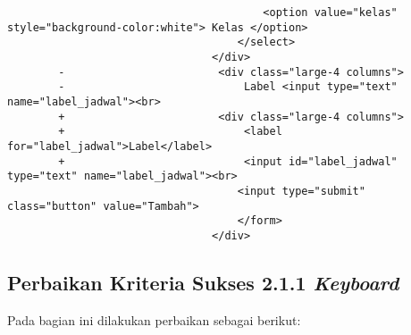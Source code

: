 \begin{itemize}
\begin{lstlisting}
                                        <option value="kelas" style="background-color:white"> Kelas </option>
                                    </select>
                                </div>
        -                        <div class="large-4 columns">
        -                            Label <input type="text" name="label_jadwal"><br>
        +                        <div class="large-4 columns">   
        +                            <label for="label_jadwal">Label</label>
        +                            <input id="label_jadwal" type="text" name="label_jadwal"><br>
                                    <input type="submit" class="button" value="Tambah">
                                    </form>
                                </div>
    \end{lstlisting}
\end{itemize}

\subsection{Perbaikan Kriteria Sukses 2.1.1 \textit{Keyboard}}
\label{subsec:perbaikan_kriteria_sukses_2.1.1}
Pada bagian ini dilakukan perbaikan sebagai berikut:

